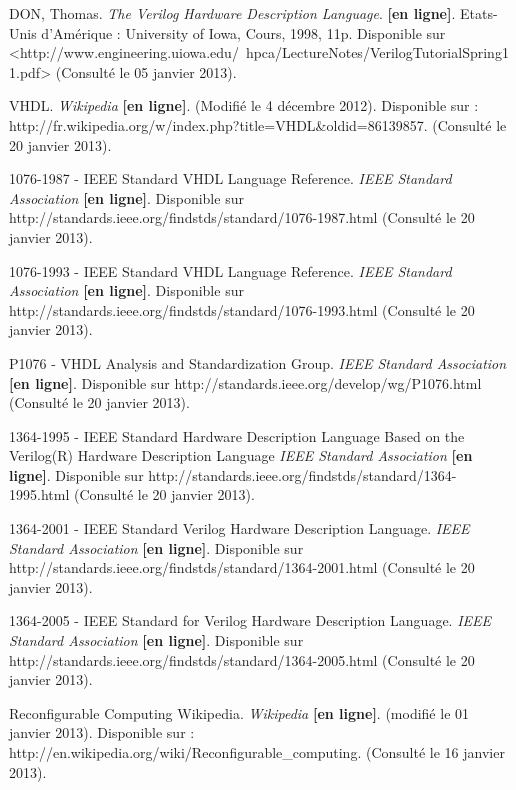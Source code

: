 \documentclass{report}
\begin{document}
\begin{thebibliography}{1}
DON, Thomas. \textit{The Verilog Hardware Description Language}. \textbf{[en ligne]}. Etats-Unis d'Amérique : University of Iowa, Cours, 1998, 11p. Disponible sur <http://www.engineering.uiowa.edu/~hpca/LectureNotes/VerilogTutorialSpring11.pdf> (Consulté le 05 janvier 2013).

VHDL. \textit{Wikipedia} \textbf{[en ligne]}. (Modifié le 4 décembre 2012). Disponible sur : http://fr.wikipedia.org/w/index.php?title=VHDL\&oldid=86139857. (Consulté le 20 janvier 2013).

1076-1987 - IEEE Standard VHDL Language Reference. \textit{IEEE Standard Association} \textbf{[en ligne]}. Disponible sur http://standards.ieee.org/findstds/standard/1076-1987.html (Consulté le 20 janvier 2013).

1076-1993 - IEEE Standard VHDL Language Reference. \textit{IEEE Standard Association} \textbf{[en ligne]}. Disponible sur http://standards.ieee.org/findstds/standard/1076-1993.html (Consulté le 20 janvier 2013).

P1076 - VHDL Analysis and Standardization Group. \textit{IEEE Standard Association} \textbf{[en ligne]}. Disponible sur http://standards.ieee.org/develop/wg/P1076.html (Consulté le 20 janvier 2013).

1364-1995 - IEEE Standard Hardware Description Language Based on the Verilog(R) Hardware Description Language \textit{IEEE Standard Association} \textbf{[en ligne]}. Disponible sur http://standards.ieee.org/findstds/standard/1364-1995.html (Consulté le 20 janvier 2013).

1364-2001 - IEEE Standard Verilog Hardware Description Language. \textit{IEEE Standard Association} \textbf{[en ligne]}. Disponible sur http://standards.ieee.org/findstds/standard/1364-2001.html (Consulté le 20 janvier 2013).

1364-2005 - IEEE Standard for Verilog Hardware Description Language. \textit{IEEE Standard Association} \textbf{[en ligne]}. Disponible sur http://standards.ieee.org/findstds/standard/1364-2005.html (Consulté le 20 janvier 2013).

Reconfigurable Computing Wikipedia. \textit{Wikipedia} \textbf{[en ligne]}. (modifié le 01 janvier 2013). Disponible sur : http://en.wikipedia.org/wiki/Reconfigurable\_computing. (Consulté le 16 janvier 2013).


\end{thebibliography}
\end{document}
